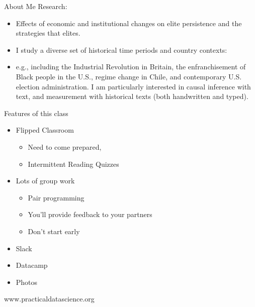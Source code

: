 \documentclass[11pt]{beamer}
\begin{document}
\begin{frame}[c]{About Me}
	Research:
	\begin{itemize}
		\pause \item Effects of economic and institutional changes on elite persistence and the strategies that elites.
		\pause \item I study a diverse set of historical time periods and country contexts:
		\item e.g., including the Industrial Revolution in Britain, the enfranchisement of Black people in the U.S., regime change in Chile, and contemporary U.S. election administration.
		\pause I am particularly interested in causal inference with text, and measurement with historical texts (both handwritten and typed).
	\end{itemize}
\end{frame}







\begin{frame}[c]{Features of this class}
\begin{itemize}
	\item Flipped Classroom
	\begin{itemize}
		\pause \item Need to come prepared,
		\pause \item Intermittent Reading Quizzes
	\end{itemize}
	\pause \item Lots of group work
	\begin{itemize}
		\pause \item Pair programming
		\pause \item You'll provide feedback to your partners
		\pause \item Don't start early
	\end{itemize}
	\pause \item Slack
	\pause \item Datacamp
	\pause \item Photos
\end{itemize}
\end{frame}


\begin{frame}[c]{}
	\begin{center}
www.practicaldatascience.org
	\end{center}
\end{frame}
\end{document}
